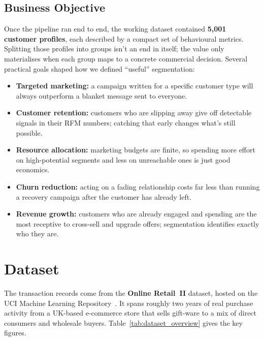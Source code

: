 \documentclass[12pt, a4paper]{article}
\begin{document}
\subsection{Business Objective}

Once the pipeline ran end to end, the working dataset contained \textbf{5,001 customer profiles}, each described by a compact set of behavioural metrics. Splitting those profiles into groups isn't an end in itself; the value only materialises when each group maps to a concrete commercial decision. Several practical goals shaped how we defined ``useful'' segmentation:

\begin{itemize}[nosep]
    \item \textbf{Targeted marketing:} a campaign written for a specific customer type will always outperform a blanket message sent to everyone.
    \item \textbf{Customer retention:} customers who are slipping away give off detectable signals in their RFM numbers; catching that early changes what's still possible.
    \item \textbf{Resource allocation:} marketing budgets are finite, so spending more effort on high-potential segments and less on unreachable ones is just good economics.
    \item \textbf{Churn reduction:} acting on a fading relationship costs far less than running a recovery campaign after the customer has already left.
    \item \textbf{Revenue growth:} customers who are already engaged and spending are the most receptive to cross-sell and upgrade offers; segmentation identifies exactly who they are.
\end{itemize}

\section{Dataset}\label{sec:dataset}

The transaction records come from the \textbf{Online Retail~II} dataset, hosted on the UCI Machine Learning Repository~\cite{uci_retail}. It spans roughly two years of real purchase activity from a UK-based e-commerce store that sells gift-ware to a mix of direct consumers and wholesale buyers. Table~\ref{tab:dataset_overview} gives the key figures.
\end{document}
